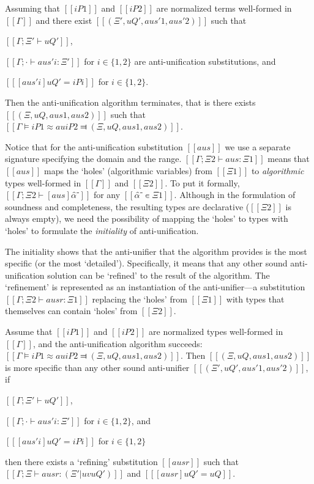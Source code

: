 \begin{lemma*}
    \label{lemma:au-completeness}
    Assuming that $[[iP1]]$ and $[[iP2]]$ are normalized terms well-formed in $[[Γ]]$
    and there exist  $[[(Ξ', uQ', aus'1, aus'2)]]$ such that
    \begin{enumerate*}
        \item $[[Γ ; Ξ' ⊢ uQ']]$,
        \item $[[Γ ; · ⊢ aus'i : Ξ']]$ for $i \in \{1,2\}$ 
        are anti-unification substitutions, and
        \item $[[ [aus'i] uQ' = iPi ]]$ for $i \in \{1,2\}$.
    \end{enumerate*}

    Then the anti-unification algorithm terminates, that is there exists
    $[[(Ξ, uQ, aus1, aus2)]]$ such that $[[Γ ⊨ iP1 ≈au iP2 ⫤ (Ξ, uQ, aus1, aus2)]]$.
\end{lemma*}

Notice that for the anti-unification substitution $[[aus]]$ we use a separate
signature specifying the domain and the range. $[[Γ ; Ξ2 ⊢ aus : Ξ1]]$ means
that $[[aus]]$ maps the `holes' (\ie algorithmic variables) from $[[Ξ1]]$
to \emph{algorithmic} types well-formed in $[[Γ]]$ and $[[Ξ2]]$. To put it
formally, $[[Γ ; Ξ2 ⊢ [aus]α̂⁻]]$ for any $[[α̂⁻ ∊ Ξ1]]$.
Although in the formulation of soundness and completeness, the resulting types are declarative
(\ie $[[Ξ2]]$ is always empty), we need the possibility of mapping the
`holes' to types with `holes' to formulate the \emph{initiality} of
anti-unification.

The initiality shows that the anti-unifier that the algorithm provides is the
most specific (or the most `detailed'). Specifically, it means that any other
sound anti-unification solution can be `refined' to the result of the algorithm.  
The `refinement' is represented as an instantiation of the anti-unifier---a 
substitution $[[Γ ; Ξ2 ⊢ ausr : Ξ1]]$ replacing the `holes' from $[[Ξ1]]$ with
types that themselves can contain `holes' from $[[Ξ2]]$.

\begin{lemma*}
        Assume that $[[iP1]]$ and $[[iP2]]$ are normalized types well-formed in $[[Γ]]$, 
        and the anti-unification algorithm succeeds: $[[Γ ⊨ iP1 ≈au iP2 ⫤ (Ξ, uQ, aus1, aus2)]]$. 
        Then $[[(Ξ, uQ, aus1, aus2)]]$ is more specific than
        any other sound anti-unifier $[[(Ξ', uQ', aus'1, aus'2)]]$, \ie if
        \begin{enumerate*}
            \item $[[Γ ; Ξ' ⊢ uQ']]$,
            \item $[[Γ ; · ⊢ aus'i : Ξ']]$ for $i \in \{1,2\}$, and
            \item $[[ [aus'i] uQ' = iPi ]]$ for $i \in \{1,2\}$
        \end{enumerate*}
        then there exists a `refining' substitution $[[ausr]]$ such that
        $[[Γ ; Ξ ⊢ ausr : (Ξ' | uv uQ')]]$ and $[[ [ausr] uQ' = uQ ]]$. 
\end{lemma*}

